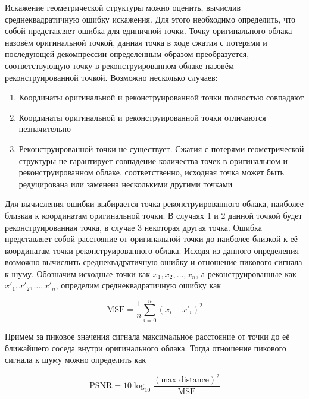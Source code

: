 
Искажение геометрической структуры можно оценить, вычислив среднеквадратичную
ошибку искажения. Для этого необходимо определить, что собой представляет ошибка
для единичной точки. Точку оригинального облака назовём оригинальной точкой,
данная точка в ходе сжатия с потерями и последующей декомпрессии определенным
образом преобразуется, соответствующую точку в реконструированном облаке назовём
реконструированной точкой. Возможно несколько случаев:

\begin{enumerate}
    \item Координаты оригинальной и реконструированной точки полностью совпадают
    \item Координаты оригинальной и реконструированной точки отличаются
    незначительно
    \item Реконструированной точки не существует. Сжатия с потерями
    геометрической структуры не гарантирует совпадение количества точек в
    оригинальном и реконструированном облаке, соответственно, исходная точка
    может быть редуцирована или заменена несколькими другими точками
\end{enumerate}

Для вычисления ошибки выбирается точка реконструированного облака, наиболее
близкая к координатам оригинальной точки. В случаях 1 и 2 данной точкой будет
реконструированная точка, в случае 3 некоторая другая точка. Ошибка представляет
собой расстояние от оригинальной точки до наиболее близкой к её координатам
точки реконструированного облака. Исходя из данного определения возможно
вычислить среднеквадратичную ошибку и отношение пикового сигнала к шуму. Обозначим
исходные точки как $x_{1}, x_{2}, \dots, x_{n}$, а реконструированные как
$x'_{1}, x'_{2}, \dots, x'_{n}$, определим среднеквадратичную ошибку как

\begin{equation} \label{eq:cloud_mse}
    \text{MSE} = \frac{1}{n} \sum_{i = 0}^{n} \left( x_{i} - x'_{i} \right)^{2}
\end{equation}

Примем за пиковое значения сигнала максимальное расстояние от точки до её
ближайшего соседа внутри оригинального облака. Тогда отношение пикового сигнала
к шуму можно определить как

\begin{equation} \label{eq:cloud_psnr}
    \text{PSNR} = 10\log_{10} \frac{\left(\text{max distance}\right)^{2}}{\text{MSE}}
\end{equation}

